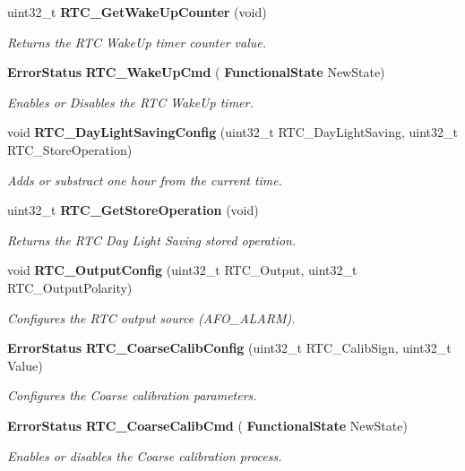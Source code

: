 \begin{DoxyCompactItemize}
uint32\+\_\+t \textbf{ R\+T\+C\+\_\+\+Get\+Wake\+Up\+Counter} (void)
\begin{DoxyCompactList}\small\item\em Returns the R\+TC Wake\+Up timer counter value. \end{DoxyCompactList}\item 
\textbf{ Error\+Status} \textbf{ R\+T\+C\+\_\+\+Wake\+Up\+Cmd} (\textbf{ Functional\+State} New\+State)
\begin{DoxyCompactList}\small\item\em Enables or Disables the R\+TC Wake\+Up timer. \end{DoxyCompactList}\item 
void \textbf{ R\+T\+C\+\_\+\+Day\+Light\+Saving\+Config} (uint32\+\_\+t R\+T\+C\+\_\+\+Day\+Light\+Saving, uint32\+\_\+t R\+T\+C\+\_\+\+Store\+Operation)
\begin{DoxyCompactList}\small\item\em Adds or substract one hour from the current time. \end{DoxyCompactList}\item 
uint32\+\_\+t \textbf{ R\+T\+C\+\_\+\+Get\+Store\+Operation} (void)
\begin{DoxyCompactList}\small\item\em Returns the R\+TC Day Light Saving stored operation. \end{DoxyCompactList}\item 
void \textbf{ R\+T\+C\+\_\+\+Output\+Config} (uint32\+\_\+t R\+T\+C\+\_\+\+Output, uint32\+\_\+t R\+T\+C\+\_\+\+Output\+Polarity)
\begin{DoxyCompactList}\small\item\em Configures the R\+TC output source (A\+F\+O\+\_\+\+A\+L\+A\+RM). \end{DoxyCompactList}\item 
\textbf{ Error\+Status} \textbf{ R\+T\+C\+\_\+\+Coarse\+Calib\+Config} (uint32\+\_\+t R\+T\+C\+\_\+\+Calib\+Sign, uint32\+\_\+t Value)
\begin{DoxyCompactList}\small\item\em Configures the Coarse calibration parameters. \end{DoxyCompactList}\item 
\textbf{ Error\+Status} \textbf{ R\+T\+C\+\_\+\+Coarse\+Calib\+Cmd} (\textbf{ Functional\+State} New\+State)
\begin{DoxyCompactList}\small\item\em Enables or disables the Coarse calibration process. \end{DoxyCompactList}\item 

\end{DoxyCompactItemize}

